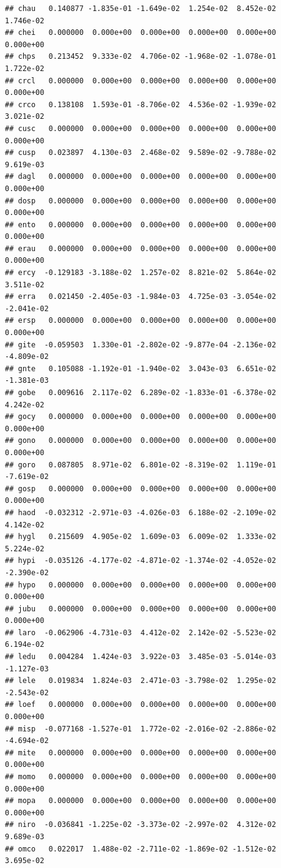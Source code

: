 \documentclass[
]{article}
\begin{document}
\begin{verbatim}
## chau   0.140877 -1.835e-01 -1.649e-02  1.254e-02  8.452e-02  1.746e-02
## chei   0.000000  0.000e+00  0.000e+00  0.000e+00  0.000e+00  0.000e+00
## chps   0.213452  9.333e-02  4.706e-02 -1.968e-02 -1.078e-01  1.722e-02
## crcl   0.000000  0.000e+00  0.000e+00  0.000e+00  0.000e+00  0.000e+00
## crco   0.138108  1.593e-01 -8.706e-02  4.536e-02 -1.939e-02  3.021e-02
## cusc   0.000000  0.000e+00  0.000e+00  0.000e+00  0.000e+00  0.000e+00
## cusp   0.023897  4.130e-03  2.468e-02  9.589e-02 -9.788e-02  9.619e-03
## dagl   0.000000  0.000e+00  0.000e+00  0.000e+00  0.000e+00  0.000e+00
## dosp   0.000000  0.000e+00  0.000e+00  0.000e+00  0.000e+00  0.000e+00
## ento   0.000000  0.000e+00  0.000e+00  0.000e+00  0.000e+00  0.000e+00
## erau   0.000000  0.000e+00  0.000e+00  0.000e+00  0.000e+00  0.000e+00
## ercy  -0.129183 -3.188e-02  1.257e-02  8.821e-02  5.864e-02  3.511e-02
## erra   0.021450 -2.405e-03 -1.984e-03  4.725e-03 -3.054e-02 -2.041e-02
## ersp   0.000000  0.000e+00  0.000e+00  0.000e+00  0.000e+00  0.000e+00
## gite  -0.059503  1.330e-01 -2.802e-02 -9.877e-04 -2.136e-02 -4.809e-02
## gnte   0.105088 -1.192e-01 -1.940e-02  3.043e-03  6.651e-02 -1.381e-03
## gobe   0.009616  2.117e-02  6.289e-02 -1.833e-01 -6.378e-02  4.242e-02
## gocy   0.000000  0.000e+00  0.000e+00  0.000e+00  0.000e+00  0.000e+00
## gono   0.000000  0.000e+00  0.000e+00  0.000e+00  0.000e+00  0.000e+00
## goro   0.087805  8.971e-02  6.801e-02 -8.319e-02  1.119e-01 -7.619e-02
## gosp   0.000000  0.000e+00  0.000e+00  0.000e+00  0.000e+00  0.000e+00
## haod  -0.032312 -2.971e-03 -4.026e-03  6.188e-02 -2.109e-02  4.142e-02
## hygl   0.215609  4.905e-02  1.609e-03  6.009e-02  1.333e-02  5.224e-02
## hypi  -0.035126 -4.177e-02 -4.871e-02 -1.374e-02 -4.052e-02 -2.390e-02
## hypo   0.000000  0.000e+00  0.000e+00  0.000e+00  0.000e+00  0.000e+00
## jubu   0.000000  0.000e+00  0.000e+00  0.000e+00  0.000e+00  0.000e+00
## laro  -0.062906 -4.731e-03  4.412e-02  2.142e-02 -5.523e-02  6.194e-02
## ledu   0.004284  1.424e-03  3.922e-03  3.485e-03 -5.014e-03 -1.127e-03
## lele   0.019834  1.824e-03  2.471e-03 -3.798e-02  1.295e-02 -2.543e-02
## loef   0.000000  0.000e+00  0.000e+00  0.000e+00  0.000e+00  0.000e+00
## misp  -0.077168 -1.527e-01  1.772e-02 -2.016e-02 -2.886e-02 -4.694e-02
## mite   0.000000  0.000e+00  0.000e+00  0.000e+00  0.000e+00  0.000e+00
## momo   0.000000  0.000e+00  0.000e+00  0.000e+00  0.000e+00  0.000e+00
## mopa   0.000000  0.000e+00  0.000e+00  0.000e+00  0.000e+00  0.000e+00
## niro  -0.036841 -1.225e-02 -3.373e-02 -2.997e-02  4.312e-02  9.689e-03
## omco   0.022017  1.488e-02 -2.711e-02 -1.869e-02 -1.512e-02  3.695e-02

\end{verbatim}
\end{document}
